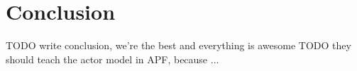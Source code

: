 \chapter{Conclusion}
TODO write conclusion, we're the best and everything is awesome
TODO they should teach the actor model in APF, because ...
